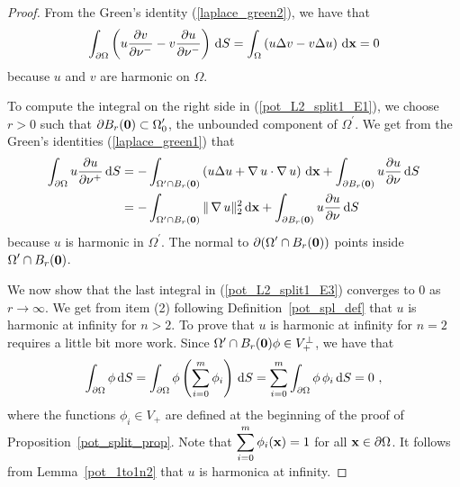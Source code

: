 \begin{proof}
From the Green's identity (\ref{laplace_green2}), we have that
\begin{equation} \label{pot_L2_split1_E2}
\int_{\partial \Omega} \left( u \frac{\partial{v}}{\partial \mathbf{\nu}^-}
- v \frac{\partial{u}}{\partial \mathbf{\nu}^-} \right) \,\mathrm{d}{S}
= \int_\Omega \left( u \Delta v -  v \Delta u \right)
\,\mathrm{d}{\mathbf{x}} = 0
\end{equation}
because $u$ and $v$ are harmonic on $\Omega$.

To compute the integral on the right side in (\ref{pot_L2_split1_E1}),
we choose $r>0$ such that
$\displaystyle \partial B_r(\mathbf{0}) \subset \Omega_0^{\prime}$,
the unbounded component of $\displaystyle \Omega^{\prime}$.
We get from the Green's identities (\ref{laplace_green1}) that
\begin{align}
\int_{\partial \Omega} u \frac{\partial{u}}{\partial \mathbf{\nu}^+} \,\mathrm{d}{S} 
&= -\int_{\Omega^{\prime} \cap B_r(\mathbf{0})}
\left( u \Delta u + \operatorname{\nabla} u \cdot \operatorname{\nabla} u \right)
\,\mathrm{d}{\mathbf{x}} + \int_{\partial B_r(\mathbf{0})} u \frac{\partial{u}}{\partial \mathbf{\nu}} \,\mathrm{d}{S}
\nonumber \\
&= -\int_{\Omega^{\prime} \cap B_r(\mathbf{0})} \|\operatorname{\nabla} u\|_2^2 \,\mathrm{d}{\mathbf{x}}
+ \int_{\partial B_r(\mathbf{0})} u \frac{\partial{u}}{\partial \mathbf{\nu}} \,\mathrm{d}{S}
\label{pot_L2_split1_E3}
\end{align}
because $u$ is harmonic in $\displaystyle \Omega^{\prime}$.  The
normal to $\displaystyle \partial (\Omega^{\prime} \cap B_r(\mathbf{0}))$
points inside $\displaystyle \Omega^{\prime} \cap B_r(\mathbf{0})$.

We now show that the last integral in (\ref{pot_L2_split1_E3}) converges
to $0$ as $r \to \infty$.  We get from item (2) following
Definition~\ref{pot_spl_def} that $u$ is harmonic at infinity for
$n>2$.  To prove that $u$ is harmonic at infinity for $n=2$ requires a
little bit more work.  Since
$\Omega^{\prime} \cap B_r(\mathbf{0})\phi \in V_+^\perp$, we have that
\[
\int_{\partial \Omega} \phi \dx{S}
= \int_{\partial \Omega} \phi \left( \sum_{i=0}^m \phi_i\right) \dx{S}
= \sum_{i=0}^m \int_{\partial \Omega} \phi \,\phi_i \dx{S} = 0 \ ,
\]
where the functions $\phi_i \in V_+$ are defined at the beginning of
the proof of Proposition~\ref{pot_split_prop}.  Note that
$\displaystyle \sum_{i=0}^m \phi_i(\mathbf{x}) = 1$ for all
$\mathbf{x} \in \partial \Omega$.  It follows from
Lemma~\ref{pot_1to1n2} that $u$ is harmonica at infinity.


\end{proof}
